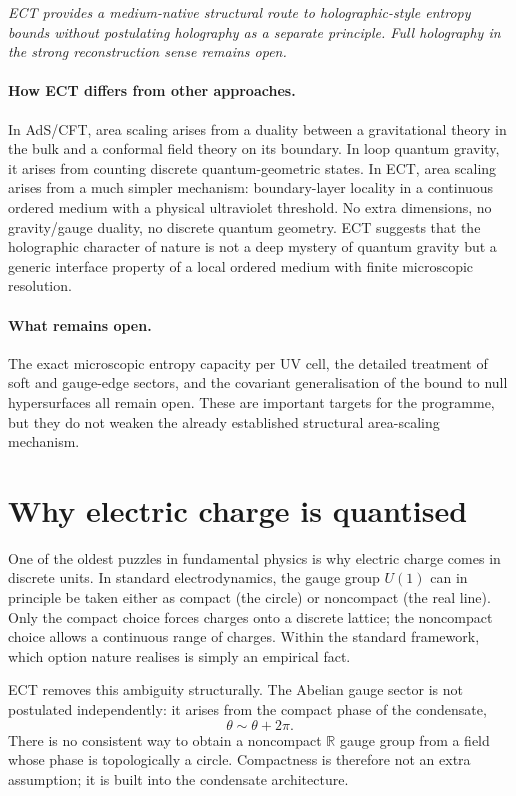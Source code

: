 \documentclass[11pt,a4paper]{article}
\begin{document}
\emph{ECT provides a medium-native structural route to
holographic-style entropy bounds without postulating holography
as a separate principle.
Full holography in the strong reconstruction sense remains open.}

\paragraph{How ECT differs from other approaches.}
In AdS/CFT, area scaling arises from a duality between a
gravitational theory in the bulk and a conformal field theory on
its boundary.
In loop quantum gravity, it arises from counting discrete
quantum-geometric states.
In ECT, area scaling arises from a much simpler mechanism:
boundary-layer locality in a continuous ordered medium with a
physical ultraviolet threshold.
No extra dimensions, no gravity/gauge duality, no discrete
quantum geometry.
ECT suggests that the holographic character of nature is not a
deep mystery of quantum gravity but a generic interface property
of a local ordered medium with finite microscopic resolution.

\paragraph{What remains open.}
The exact microscopic entropy capacity per UV cell, the detailed
treatment of soft and gauge-edge sectors, and the covariant
generalisation of the bound to null hypersurfaces all remain
open.
These are important targets for the programme, but they do not
weaken the already established structural area-scaling mechanism.


\section{Why electric charge is quantised}
\label{sec:pop_charge}

One of the oldest puzzles in fundamental physics is why electric
charge comes in discrete units. In standard electrodynamics, the
gauge group $U(1)$ can in principle be taken either as compact
(the circle) or noncompact (the real line). Only the compact
choice forces charges onto a discrete lattice; the noncompact
choice allows a continuous range of charges. Within the standard
framework, which option nature realises is simply an empirical fact.

ECT removes this ambiguity structurally. The Abelian gauge sector is
not postulated independently: it arises from the compact phase of the
condensate,
\[
\theta \sim \theta + 2\pi.
\]
There is no consistent way to obtain a noncompact $\mathbb{R}$ gauge
group from a field whose phase is topologically a circle. Compactness
is therefore not an extra assumption; it is built into the condensate
architecture.
\end{document}
